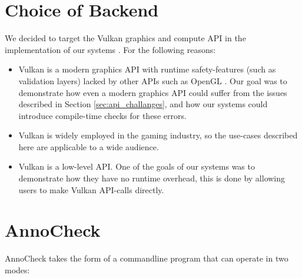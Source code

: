 \documentclass[a4paper,12pt,twoside,openright]{report}
\begin{document}

\section{Choice of Backend}

\label{sec:backend_choice}

We decided to target the Vulkan graphics and compute API in the implementation
of our systems \cite{Vulkan}. For the following reasons:

\begin{itemize}

    \item Vulkan is a modern graphics API with runtime safety-features (such as
    validation layers) lacked by other APIs such as OpenGL
    \cite{VulkanValidationLayers}. Our goal was to demonstrate how even a
    modern graphics API could suffer from the issues described in Section
    \ref{sec:api_challanges}, and how our systems could introduce compile-time
    checks for these errors.

    \item Vulkan is widely employed in the gaming industry, so the use-cases
    described here are applicable to a wide audience.

    \item Vulkan is a low-level API. One of the goals of our systems was to
    demonstrate how they have no runtime overhead, this is done by allowing
    users to make Vulkan API-calls directly.

\end{itemize}

\section{AnnoCheck}

\label{sec:anno_check_implementation}

AnnoCheck takes the form of a commandline program that can operate in two
modes:
\end{document}
